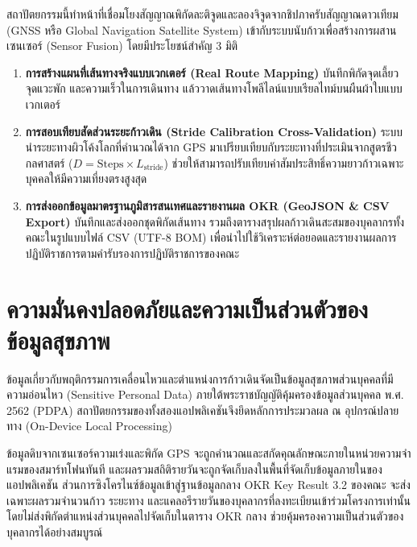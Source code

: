 สถาปัตยกรรมนี้ทำหน้าที่เชื่อมโยงสัญญาณพิกัดละติจูดและลองจิจูดจากชิปภาครับสัญญาณดาวเทียม (GNSS หรือ Global Navigation Satellite System) เข้ากับระบบนับก้าวเพื่อสร้างการผสานเซนเซอร์ (Sensor Fusion) โดยมีประโยชน์สำคัญ 3 มิติ
\begin{enumerate}
    \item \textbf{การสร้างแผนที่เส้นทางจริงแบบเวกเตอร์ (Real Route Mapping)} บันทึกพิกัดจุดเลี้ยว จุดแวะพัก และความเร็วในการเดินทาง แล้ววาดเส้นทางโพลีไลน์แบบเรียลไทม์บนผืนผ้าใบแบบเวกเตอร์
    \item \textbf{การสอบเทียบสัดส่วนระยะก้าวเดิน (Stride Calibration Cross-Validation)} ระบบนำระยะทางผิวโค้งโลกที่คำนวณได้จาก GPS มาเปรียบเทียบกับระยะทางที่ประเมินจากสูตรชีวกลศาสตร์ ($D = \text{Steps} \times L_{\text{stride}}$) ช่วยให้สามารถปรับเทียบค่าสัมประสิทธิ์ความยาวก้าวเฉพาะบุคคลให้มีความเที่ยงตรงสูงสุด
    \item \textbf{การส่งออกข้อมูลมาตรฐานภูมิสารสนเทศและรายงานผล OKR (GeoJSON \& CSV Export)} บันทึกและส่งออกชุดพิกัดเส้นทาง รวมถึงตารางสรุปผลก้าวเดินสะสมของบุคลากรทั้งคณะในรูปแบบไฟล์ CSV (UTF-8 BOM) เพื่อนำไปใช้วิเคราะห์ต่อยอดและรายงานผลการปฏิบัติราชการตามคำรับรองการปฏิบัติราชการของคณะ
\end{enumerate}

\section{ความมั่นคงปลอดภัยและความเป็นส่วนตัวของข้อมูลสุขภาพ}
ข้อมูลเกี่ยวกับพฤติกรรมการเคลื่อนไหวและตำแหน่งการก้าวเดินจัดเป็นข้อมูลสุขภาพส่วนบุคคลที่มีความอ่อนไหว (Sensitive Personal Data) ภายใต้พระราชบัญญัติคุ้มครองข้อมูลส่วนบุคคล พ.ศ. 2562 (PDPA) สถาปัตยกรรมของทั้งสองแอปพลิเคชันจึงยึดหลักการประมวลผล ณ อุปกรณ์ปลายทาง (On-Device Local Processing)

ข้อมูลดิบจากเซนเซอร์ความเร่งและพิกัด GPS จะถูกคำนวณและสกัดคุณลักษณะภายในหน่วยความจำแรมของสมาร์ทโฟนทันที และผลรวมสถิติรายวันจะถูกจัดเก็บลงในพื้นที่จัดเก็บข้อมูลภายในของแอปพลิเคชัน ส่วนการซิงโครไนซ์ข้อมูลเข้าสู่ฐานข้อมูลกลาง OKR Key Result 3.2 ของคณะ จะส่งเฉพาะผลรวมจำนวนก้าว ระยะทาง และแคลอรีรายวันของบุคลากรที่ลงทะเบียนเข้าร่วมโครงการเท่านั้น โดยไม่ส่งพิกัดตำแหน่งส่วนบุคคลไปจัดเก็บในตาราง OKR กลาง ช่วยคุ้มครองความเป็นส่วนตัวของบุคลากรได้อย่างสมบูรณ์

